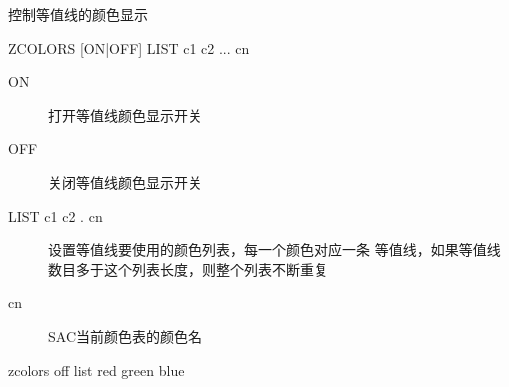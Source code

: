 \label{cmd:zcolors}

控制等值线的颜色显示

\begin{SACSTX}
ZCOLORS [ON|OFF] LIST c1 c2 ... cn
\end{SACSTX}

\begin{description}
\item [ON] 打开等值线颜色显示开关
\item [OFF] 关闭等值线颜色显示开关
\item [LIST c1 c2 . cn] 设置等值线要使用的颜色列表，每一个颜色对应一条
    等值线，如果等值线数目多于这个列表长度，则整个列表不断重复
\item [cn] SAC当前颜色表的颜色名
\end{description}

\begin{SACDFT}
zcolors off list red green blue
\end{SACDFT}

